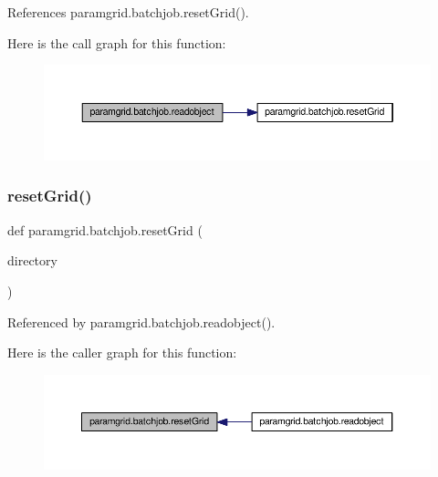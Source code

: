 References paramgrid.\+batchjob.\+reset\+Grid().

Here is the call graph for this function\+:
\nopagebreak
\begin{figure}[H]
\begin{center}
\leavevmode
\includegraphics[width=350pt]{namespaceparamgrid_1_1batchjob_a45df97d60ead0891964ff9f217b24deb_cgraph}
\end{center}
\end{figure}
\mbox{\label{namespaceparamgrid_1_1batchjob_a401180cffb94a943e7b5b87dc61ef71f}} 
\subsubsection{\texorpdfstring{reset\+Grid()}{resetGrid()}}
{\footnotesize\ttfamily def paramgrid.\+batchjob.\+reset\+Grid (\begin{DoxyParamCaption}\item[{}]{directory }\end{DoxyParamCaption})}



Referenced by paramgrid.\+batchjob.\+readobject().

Here is the caller graph for this function\+:
\nopagebreak
\begin{figure}[H]
\begin{center}
\leavevmode
\includegraphics[width=350pt]{namespaceparamgrid_1_1batchjob_a401180cffb94a943e7b5b87dc61ef71f_icgraph}
\end{center}
\end{figure}
\mbox{\label{namespaceparamgrid_1_1batchjob_ab909ba8e3e40ef0f62bd3bff2dc06587}} 
